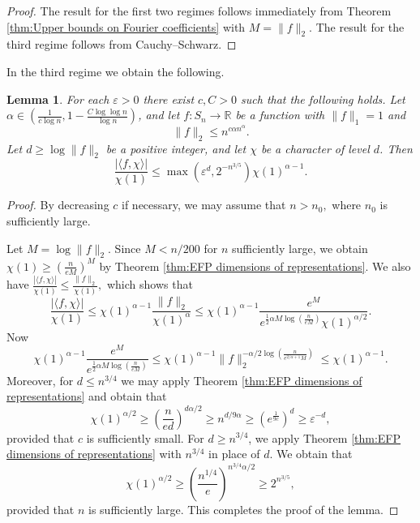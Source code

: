 \documentclass[11pt, letterpaper]{amsart}
\newtheorem{lem}[thm]{Lemma}
\newcommand\eps{\varepsilon}
\renewcommand\ge{\geqslant}
\renewcommand\le{\leqslant}
\renewcommand{\epsilon}{\eps}
\begin{document}
\begin{proof}
    The result for the first two regimes follows immediately from Theorem \ref{thm:Upper bounds on Fourier coefficients} with $M= \|f\|_2$. The result for the third regime follows from Cauchy--Schwarz.
    \end{proof}


In the third regime we obtain the following.
\begin{lem}\label{lem: largest degree}
For each $\epsilon>0$ there exist $c,C>0$ such that the following holds. Let $\alpha\in \left( \frac{1}{c\log n}, 1 - \frac{C\log \log n}{\log n}\right)$, and let $f\colon S_n \to \mathbb{R}$ be a function with $\|f\|_1=1$ and  \[\|f\|_2\le n^{c\alpha n^{\alpha}}.\] Let $d\ge \log\|f\|_2$ be a positive integer, and let $\chi$ be a character of level $d$. Then 
\[ \frac{\left|\langle f, \chi\rangle\right|}{\chi(1)} \le \max(\epsilon^{d}, 2^{-n^{3/5}})\chi(1)^{\alpha -1}.
\]
\end{lem}
\begin{proof}
    By decreasing $c$ if necessary, we may assume that $n>n_0,$ where $n_0$ is sufficiently large.


    Let $M= \log\|f\|_2$. Since $M<n/200$ for $n$ sufficiently large, we obtain $\chi(1) \ge \left(\frac{n}{eM}\right)^{M}$ by Theorem \ref{thm:EFP dimensions of representations}. We also have $\frac{\left|\langle f, \chi\rangle\right|}{\chi(1)} \le \frac{\|f\|_2}{\chi(1)},$ which shows that \[\frac{\left|\langle f, \chi\rangle\right|}{\chi(1)} \le \chi(1)^{\alpha -1} \frac{\|f\|_2}{\chi(1)^{\alpha}}\le \chi(1)^{\alpha-1}\frac{e^{M}}{e^{\frac{1}{2}\alpha M\log(\frac{n}{eM})}\chi(1)^{\alpha/2}}.\]
    Now 
     \[ \chi(1)^{\alpha-1}\frac{e^{M}}{e^{\frac{1}{2}\alpha M\log(\frac{n}{eM})}} \le  \chi(1)^{\alpha-1}\|f\|_2^{-\alpha/2\log\left(\frac{n}{e^{2/\alpha +1}M}\right)} \le \chi(1)^{\alpha -1}.\]
     Moreover, for $d\le n^{3/4}$ we may apply Theorem \ref{thm:EFP dimensions of representations} and obtain that \[\chi(1)^{\alpha/2} \ge \left(\frac{n}{ed}\right)^{d\alpha/2} \ge n^{d/9 \alpha} \ge \left(e^{\frac{1}{9c}}\right)^d \ge \epsilon^{-d},\]
     provided that $c$ is sufficiently small. For $d\ge n^{3/4}$, we apply Theorem \ref{thm:EFP dimensions of representations} with $n^{3/4}$ in place of $d$. We obtain that
     \[\chi(1)^{\alpha/2} \ge \left(\frac{n^{1/4}}{e}\right)^{n^{3/4}\alpha/2}\ge 2^{n^{3/5}},\]
     provided that $n$ is sufficiently large.
     This completes the proof of the lemma.
\end{proof}
\end{document}
